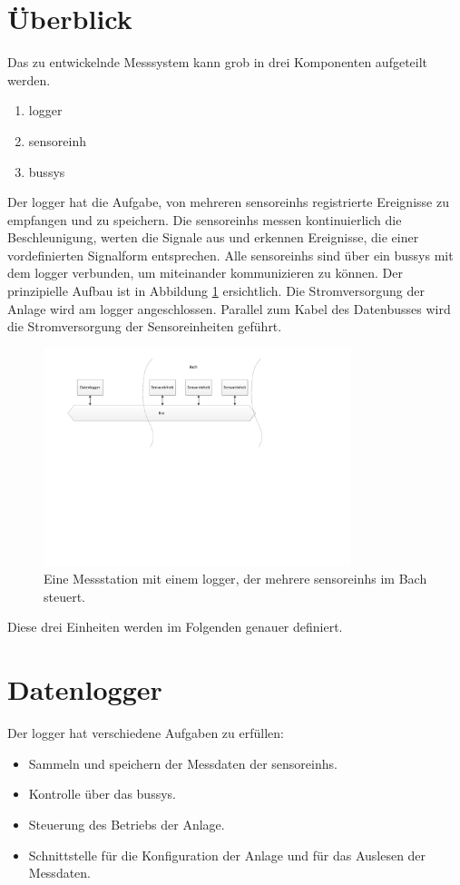 \section{Überblick}\label{sec.ueberblick}
Das zu entwickelnde Messsystem kann grob in drei Komponenten aufgeteilt werden. 
\begin{enumerate}
\item \gls{logger}
\item \gls{sensoreinh}
\item \gls{bussys}
\end{enumerate}
Der \gls{logger} hat die Aufgabe, von mehreren \glspl{sensoreinh} registrierte Ereignisse zu empfangen und zu speichern. Die \glspl{sensoreinh} messen kontinuierlich die Beschleunigung, werten die Signale aus und erkennen Ereignisse, die einer vordefinierten Signalform entsprechen. Alle \glspl{sensoreinh} sind über ein \gls{bussys} mit dem \gls{logger} verbunden, um miteinander kommunizieren zu können. Der prinzipielle Aufbau ist in Abbildung \ref{fig.situationskroki} ersichtlich. Die Stromversorgung der Anlage wird am \gls{logger} angeschlossen. Parallel zum Kabel des Datenbusses wird die Stromversorgung der Sensoreinheiten geführt.

\begin{figure}[H]
	\centering
		\includegraphics[width=0.8\textwidth]{images/visio/situationskroki.pdf}
	\caption{Eine Messstation mit einem \gls{logger}, der mehrere \glspl{sensoreinh} im Bach steuert.}
	\label{fig.situationskroki}
\end{figure}



Diese drei Einheiten werden im Folgenden genauer definiert.

\section{Datenlogger}
Der \gls{logger} hat verschiedene Aufgaben zu erfüllen:
\begin{itemize}
\item Sammeln und speichern der Messdaten der \glspl{sensoreinh}.
\item Kontrolle über das \gls{bussys}.
\item Steuerung des Betriebs der Anlage.
\item Schnittstelle für die Konfiguration der Anlage und für das Auslesen der Messdaten.
\end{itemize}



